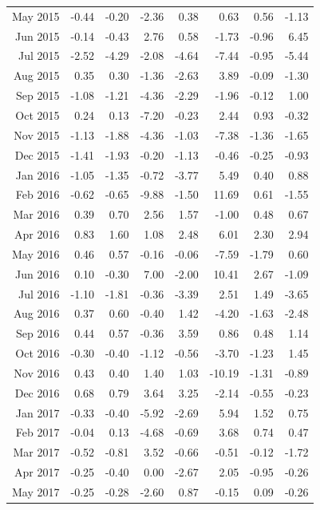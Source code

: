 \begin{tabularx}{\textwidth}{rrrrrrrr}
  May 2015 & -0.44 & -0.20 & -2.36 & 0.38 & 0.63 & 0.56 & -1.13 \\ 
  Jun 2015 & -0.14 & -0.43 & 2.76 & 0.58 & -1.73 & -0.96 & 6.45 \\ 
  Jul 2015 & -2.52 & -4.29 & -2.08 & -4.64 & -7.44 & -0.95 & -5.44 \\ 
  Aug 2015 & 0.35 & 0.30 & -1.36 & -2.63 & 3.89 & -0.09 & -1.30 \\ 
  Sep 2015 & -1.08 & -1.21 & -4.36 & -2.29 & -1.96 & -0.12 & 1.00 \\ 
  Oct 2015 & 0.24 & 0.13 & -7.20 & -0.23 & 2.44 & 0.93 & -0.32 \\ 
  Nov 2015 & -1.13 & -1.88 & -4.36 & -1.03 & -7.38 & -1.36 & -1.65 \\ 
  Dec 2015 & -1.41 & -1.93 & -0.20 & -1.13 & -0.46 & -0.25 & -0.93 \\ 
  Jan 2016 & -1.05 & -1.35 & -0.72 & -3.77 & 5.49 & 0.40 & 0.88 \\ 
  Feb 2016 & -0.62 & -0.65 & -9.88 & -1.50 & 11.69 & 0.61 & -1.55 \\ 
  Mar 2016 & 0.39 & 0.70 & 2.56 & 1.57 & -1.00 & 0.48 & 0.67 \\ 
  Apr 2016 & 0.83 & 1.60 & 1.08 & 2.48 & 6.01 & 2.30 & 2.94 \\ 
  May 2016 & 0.46 & 0.57 & -0.16 & -0.06 & -7.59 & -1.79 & 0.60 \\ 
  Jun 2016 & 0.10 & -0.30 & 7.00 & -2.00 & 10.41 & 2.67 & -1.09 \\ 
  Jul 2016 & -1.10 & -1.81 & -0.36 & -3.39 & 2.51 & 1.49 & -3.65 \\ 
  Aug 2016 & 0.37 & 0.60 & -0.40 & 1.42 & -4.20 & -1.63 & -2.48 \\ 
  Sep 2016 & 0.44 & 0.57 & -0.36 & 3.59 & 0.86 & 0.48 & 1.14 \\ 
  Oct 2016 & -0.30 & -0.40 & -1.12 & -0.56 & -3.70 & -1.23 & 1.45 \\ 
  Nov 2016 & 0.43 & 0.40 & 1.40 & 1.03 & -10.19 & -1.31 & -0.89 \\ 
  Dec 2016 & 0.68 & 0.79 & 3.64 & 3.25 & -2.14 & -0.55 & -0.23 \\ 
  Jan 2017 & -0.33 & -0.40 & -5.92 & -2.69 & 5.94 & 1.52 & 0.75 \\ 
  Feb 2017 & -0.04 & 0.13 & -4.68 & -0.69 & 3.68 & 0.74 & 0.47 \\ 
  Mar 2017 & -0.52 & -0.81 & 3.52 & -0.66 & -0.51 & -0.12 & -1.72 \\ 
  Apr 2017 & -0.25 & -0.40 & 0.00 & -2.67 & 2.05 & -0.95 & -0.26 \\ 
  May 2017 & -0.25 & -0.28 & -2.60 & 0.87 & -0.15 & 0.09 & -0.26 \\ 

\end{tabularx}
